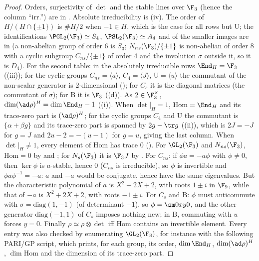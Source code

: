 \begin{proof}
Orders, surjectivity of $\det$ and the stable lines over $\F_3$ (hence the column ``irr.'') are in . Absolute irreducibility is
(iv). The order of $H/(H\cap\{\pm1\})$ is $\#H/2$ when $-1\in H$, which is the case for all rows but $\mathrm U$; the
identifications $\PGL_2(\F_3)\simeq S_4$, $\PSL_2(\F_3)\simeq A_4$ and of the smaller images are in  (a non-abelian group of order $6$ is $S_3$; $N_{ns}(\F_3)/\{\pm1\}$ is
non-abelian of order $8$ with a cyclic subgroup $C_{ns}/\{\pm1\}$ of order $4$ and the involution $\sigma$ outside it, so it is $D_4$).
For the second table: in the absolutely irreducible rows $\End_H=\F_3$ ((iii)); for the cyclic groups $C_{ns}=\langle a\rangle$,
$C_4=\langle J\rangle$, $\mathrm U=\langle u\rangle$ the commutant of the non-scalar generator is $2$-dimensional (); for $C_s$ it is the
diagonal matrices (the commutant of $\sigma$); for $\mathrm B$ it is $\F_3$ ((d)). As $2\in\F_3^\times$,
$\dim(\ad\rho)^H=\dim\End_H-1$ ((i)). When $\det|_H=1$, $\mathrm{Hom}=\End_H$ and its trace-zero part is $(\ad\rho)^H$; for the cyclic groups $C_4$ and $\mathrm U$ the commutant is
$\{\alpha+\beta g\}$ and its trace-zero part is spanned by $2g-\tr g$ ((ii)), which is $2J=-J$ for $g=J$ and $2u-2=-(u-1)$ for
$g=u$, giving the last column. When $\det|_H\ne1$,
every element of $\mathrm{Hom}$ has trace $0$ (). For $\GL_2(\F_3)$ and $N_{ns}(\F_3)$, $\mathrm{Hom}=0$ by 
and ; for $N_s(\F_3)$ it is $\F_3J$ by . For $C_{ns}$: if $\phi a=-a\phi$ with $\phi\ne0$, then $\ker\phi$ is
$a$-stable, hence $0$ ($C_{ns}$ is irreducible), so $\phi$ is invertible and $\phi a\phi^{-1}=-a$: $a$ and $-a$ would be conjugate, hence have the same eigenvalues. But the characteristic
polynomial of $a$ is $X^2-2X+2$, with roots $1\pm i$ in $\F_9$, while that of $-a$ is $X^2+2X+2$, with roots $-1\pm i$.
For $C_s$ and $\mathrm B$: $\phi$ must anticommute with $\sigma=\mathrm{diag}(1,-1)$ (of determinant $-1$), so $\phi=\sm0xy0$, and the other generator
$\mathrm{diag}(-1,1)$ of $C_s$ imposes nothing new; in $\mathrm B$, commuting with $u$ forces $y=0$. Finally $\rho\simeq\rho\otimes\det$ iff $\mathrm{Hom}$ contains an
invertible element. Every entry was also checked by enumerating $\GL_2(\F_3)$, for instance with the following PARI/GP script, which prints,
for each group, its order, $\dim\End_H$, $\dim(\ad\rho)^H$, $\dim\mathrm{Hom}$ and the dimension of its trace-zero part.
\end{proof}

